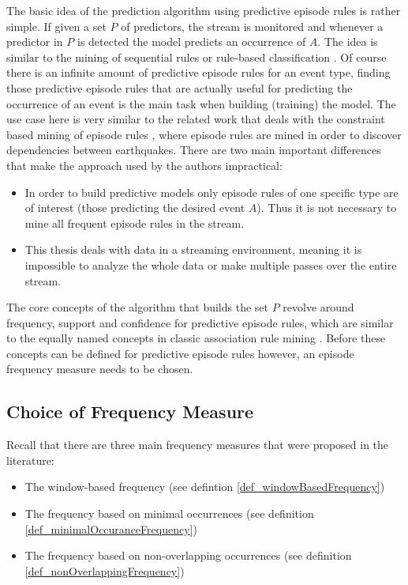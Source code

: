 The basic idea of the prediction algorithm using predictive episode rules is rather simple. If given a set $P$ of predictors, the stream is monitored and whenever a predictor in $P$ is detected the model predicts an occurrence of $A$. The idea is similar to the mining of sequential rules or rule-based classification \cite{ma1998integrating}.
Of course there is an infinite amount of predictive episode rules for an event type, finding those predictive episode rules that are actually useful for predicting the occurrence of an event is the main task when building (training) the model. The use case here is very similar to the related work that deals with the constraint based mining of episode rules \cite{meger2004constraint}, where episode rules are mined in order to discover dependencies between earthquakes. There are two main important differences that make the approach used by the authors impractical:

\begin{itemize}
 \item In order to build predictive models only episode rules of one specific type are of interest (those predicting the desired event $A$). Thus it is not necessary to mine all frequent episode rules in the stream.
 \item This thesis deals with data in a streaming environment, meaning it is impossible to analyze the whole data or make multiple passes over the entire stream.
\end{itemize}

The core concepts of the algorithm that builds the set $P$ revolve around frequency, support and confidence for predictive episode rules, which are similar to the equally named concepts in classic association rule mining \cite{agrawal1994fast}. Before these concepts can be defined for predictive episode rules however, an episode frequency measure needs to be chosen. 

\subsection{Choice of Frequency Measure}

Recall that there are three main frequency measures that were proposed in the literature:

\begin{itemize}
	\item The window-based frequency (see defintion \ref{def_windowBasedFrequency})
	\item The frequency based on minimal occurrences (see definition \ref{def_minimalOccuranceFrequency})
	\item The frequency based on non-overlapping occurrences (see definition \ref{def_nonOverlappingFrequency})
\end{itemize}

